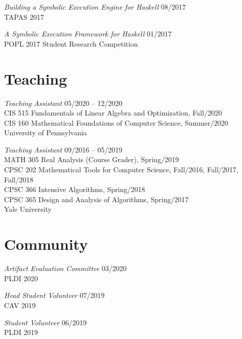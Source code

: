 \documentclass[margin]{res}
\begin{document}
\begin{resume}
\textit{Building a Symbolic Execution Engine for Haskell} \hfill 08/2017 \\
  TAPAS 2017

\textit{A Symbolic Execution Framework for Haskell} \hfill 01/2017 \\
  POPL 2017 Student Research Competition


\section{Teaching}
\textit{Teaching Assistant}
  \hfill 05/2020 -- 12/2020 \\
    {CIS 515 Fundamentals of Linear Algebra and Optimization},
      Fall/2020 \\
    {CIS 160 Mathematical Foundations of Computer Science},
      Summer/2020 \\
University of Pennsylvania

\textit{Teaching Assistant}
  \hfill 09/2016 -- 05/2019 \\
    {MATH 305 Real Analysis (Course Grader)},
      Spring/2019 \\
    {CPSC 202 Mathematical Tools for Computer Science},
      Fall/2016, Fall/2017, Fall/2018 \\
    {CPSC 366 Intensive Algorithms},
      Spring/2018 \\
    {CPSC 365 Design and Analysis of Algorithms},
      Spring/2017 \\
Yale University

\section{Community}
\textit{Artifact Evaluation Committee} \hfill 03/2020 \\
PLDI 2020

\textit{Head Student Volunteer} \hfill 07/2019 \\
CAV 2019

\textit{Student Volunteer} \hfill 06/2019 \\
PLDI 2019


\end{resume}
\end{document}
